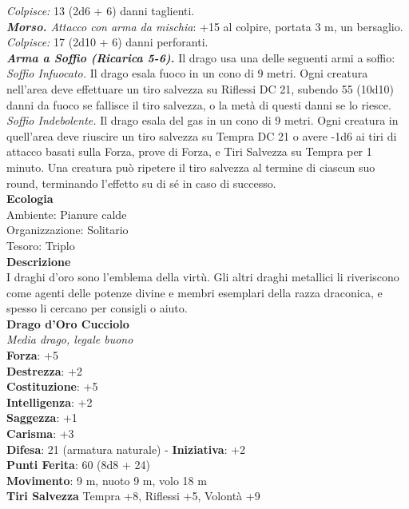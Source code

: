 \begin{multicols}{2}
\emph{Colpisce:} 13 (2d6 + 6) danni taglienti.\\
\emph{\textbf{Morso.} Attacco con arma da mischia}: +15 al colpire, portata 3 m, un bersaglio.\\
\emph{Colpisce:} 17 (2d10 + 6) danni perforanti.\\
\emph{\textbf{Arma a Soffio (Ricarica 5-6).}} Il drago usa una delle seguenti armi a soffio:\\
\emph{Soffio Infuocato.} Il drago esala fuoco in un cono di 9 metri. Ogni creatura nell'area deve effettuare un tiro salvezza su Riflessi DC  21, subendo 55 (10d10) danni da fuoco se fallisce il tiro salvezza, o la metà di questi danni se lo riesce.\\
\emph{Soffio Indebolente.} Il drago esala del gas in un cono di 9 metri. Ogni creatura in quell'area deve riuscire un tiro salvezza su Tempra DC  21 o avere -1d6 ai tiri di attacco basati sulla Forza, prove di Forza, e Tiri Salvezza su Tempra per 1 minuto. Una creatura può ripetere il tiro salvezza al termine di ciascun suo round, terminando l'effetto su di sé in caso di successo.\\
\textbf{Ecologia}\\
Ambiente: Pianure calde\\
Organizzazione: Solitario\\
Tesoro: Triplo\\
\textbf{Descrizione}\\
I draghi d'oro sono l'emblema della virtù. Gli altri draghi metallici li riveriscono come agenti delle potenze divine e membri esemplari della razza draconica, e spesso li cercano per consigli o aiuto.\\
\medskip\textbf{Drago d'Oro Cucciolo}\\
\emph{Media drago, legale buono}\\
\textbf{Forza}: +5\\
\textbf{Destrezza}: +2\\
\textbf{Costituzione}: +5\\
\textbf{Intelligenza}: +2\\
\textbf{Saggezza}: +1\\
\textbf{Carisma}: +3\\
\textbf{Difesa}: 21 (armatura naturale) - \textbf{Iniziativa}: +2\\
\textbf{Punti Ferita}: 60 (8d8 + 24)\\
\textbf{Movimento}: 9 m, nuoto 9 m, volo 18 m\\
\textbf{Tiri Salvezza} Tempra +8, Riflessi +5, Volontà +9\\

\end{multicols}
